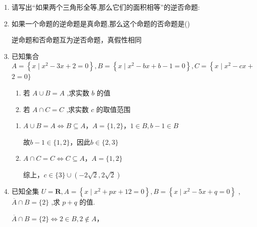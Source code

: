 \begin{enumerate}
    \item 请写出“如果两个三角形全等,那么它们的面积相等”的逆否命题:
    \item 如果一个命题的逆命题是真命题,那么这个命题的否命题是\dotfill()
    \begin{jieda}
        逆命题和否命题互为逆否命题，真假性相同
    \end{jieda}
    \item 已知集合 $A = \left\{  {x \mid  {x}^{2} - {3x} + 2 = 0}\right\}  ,B = \left\{  {x \mid  {x}^{2} - {bx} + b - 1 = 0}\right\}  ,C = \left\{  {x \mid  {x}^{2} - {cx} + }\right.$  $2 = 0\}$ 
    \begin{enumerate}
        \item 若 $A \cup  B = A$ ,求实数 $b$ 的值
        \item 若 $A \cap  C = C$ ,求实数 $c$ 的取值范围
    \end{enumerate}
    \begin{jieda}
        \begin{enumerate}
            \item $A \cup  B = A \Longleftrightarrow B \subseteq A$，$A = \{1, 2\}$，$1 \in B, b-1 \in B$

            故$b - 1 \in \{1,2\}$，因此$b \in \{2,3\}$
            \item $A \cap  C = C \Longleftrightarrow C \subseteq A$，$A = \{1, 2\}$
            
            综上，$c \in \{3\} \cup (-2\sqrt{2}, 2\sqrt{2})$
        \end{enumerate}
    \end{jieda}

    \item 已知全集 $U = \mathbf{R},A = \left\{  {x \mid  {x}^{2} + {px} + {12} = 0}\right\}  ,B = \left\{  {x \mid  {x}^{2} - {5x} + q = 0}\right\}$ , $\overline{A} \cap  B = \{ 2\}$ ,求 $p + q$ 的值.
    \begin{jieda}
        $\overline{A} \cap  B = \{ 2\} \Longleftrightarrow 2 \in B, 2 \notin A$，
        

\end{jieda}
\end{enumerate}
